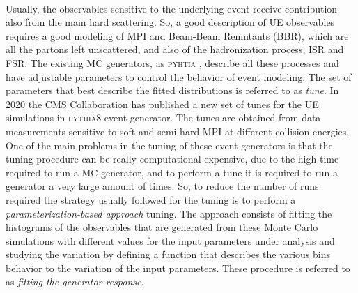 \\
Usually, the observables sensitive to the underlying event receive contribution also from the main hard scattering. So, a good  description of UE observables requires a good modeling of MPI and Beam-Beam Remntants (BBR), which are all the partons left unscattered, and also of the hadronization process, ISR and FSR. The existing MC generators, as \textsc{pyhtia} \cite{PYTHIA2015}, describe all these processes and have adjustable parameters to control the behavior of event modeling. The set of parameters that best describe the fitted distributions is referred to as \textit{tune}. 
In 2020 the CMS Collaboration has published a new set of tunes for the UE simulations \cite{CPtunes} in \textsc{pythia8} event generator. The tunes are obtained from data measurements sensitive to soft and semi-hard MPI at different collision energies. 
\\
One of the main problems in the tuning of these event generators is that the tuning procedure can be really computational expensive, due to the high time required to run a MC generator, and to perform a tune it is required to run a generator a very large amount of times. So, to reduce the number of runs required the strategy usually followed for the tuning is to perform a \textit{parameterization-based approach} tuning. The approach consists of fitting the histograms of the observables that are generated from these Monte Carlo simulations with different values for the input parameters under analysis and studying the variation by defining a function that describes the various bins behavior to the variation of the input parameters. These procedure is referred to as  \textit{fitting the generator response}.

\medskip

